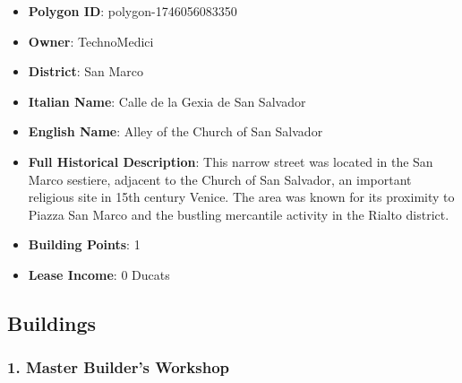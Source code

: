 \documentclass[11pt,a4paper]{article}
\begin{document}
\begin{itemize}
\item \textbf{Polygon ID}: polygon-1746056083350
\item \textbf{Owner}: TechnoMedici
\item \textbf{District}: San Marco
\item \textbf{Italian Name}: Calle de la Gexia de San Salvador
\item \textbf{English Name}: Alley of the Church of San Salvador
\item \textbf{Full Historical Description}: This narrow street was located in the San Marco sestiere, adjacent to the Church of San Salvador, an important religious site in 15th century Venice. The area was known for its proximity to Piazza San Marco and the bustling mercantile activity in the Rialto district.
\item \textbf{Building Points}: 1
\item \textbf{Lease Income}: 0 Ducats
\end{itemize}

\subsection{Buildings}

\subsubsection{1. Master Builder's Workshop}
\end{document}
